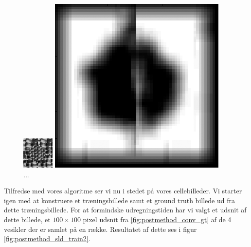 \begin{figure}[H]
	\begin{minipage}[b]{0.5\linewidth}
		\centering
		\includegraphics[scale=3]{files/postmethod/img/imTest.png}
	\end{minipage}
	\hspace{0.8cm}
	\begin{minipage}[b]{0.5\linewidth}
		\centering
		\includegraphics[scale=0.54]{files/postmethod/img/sld_res1.png}
	\end{minipage}
	\caption{...\label{fig:postmethod_sld_res1}}
\end{figure}

Tilfredse med vores algoritme ser vi nu i stedet på vores cellebilleder. Vi starter igen med at konstruere et træningsbillede samt et ground truth billede ud fra dette træningsbillede. For at formindske udregningstiden har vi valgt et udsnit af dette billede, et $100\times100$ pixel udsnit fra \ref{fig:postmethod_conv_gt} af de 4 vesikler der er samlet på en række. Resultatet af dette ses i figur \ref{fig:postmethod_sld_train2}.

